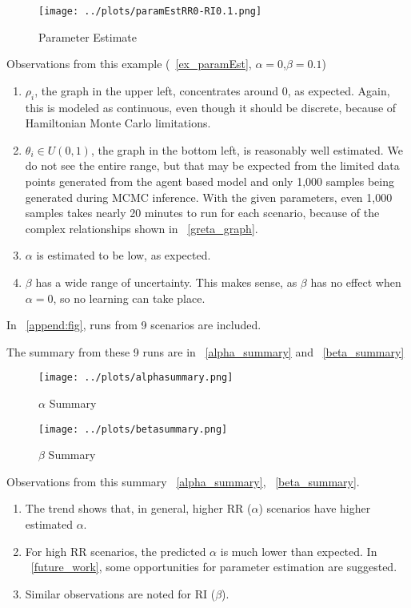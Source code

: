 \documentclass[a4paper, 11pt]{report}
\begin{document}
\begin{figure}[h!]
	\caption{Parameter Estimate}
	\label{ex_paramEst}
	\texttt{[image: ../plots/paramEstRR0-RI0.1.png]}
\end{figure}

\noindent Observations from this example (~\autoref{ex_paramEst}, $\alpha = 0$,$\beta = 0.1$)
\begin{enumerate}
\item $\rho_{i}$, the graph in the upper left, concentrates around 0, as expected. Again, this is modeled as continuous, even though it should be discrete, because of Hamiltonian Monte Carlo limitations.
\item $\theta_{i} \in U(0,1)$, the graph in the bottom left, is reasonably well estimated. We do not see the entire range, but that may be expected from the limited data points generated from the agent based model and only 1,000 samples being generated during MCMC inference. With the given parameters, even 1,000 samples takes nearly 20 minutes to run for each scenario, because of the complex relationships shown in ~\autoref{greta_graph}.
\item $\alpha$ is estimated to be low, as expected.
\item $\beta$ has a wide range of uncertainty. This makes sense, as $\beta$ has no effect when $\alpha = 0$, so no learning can take place.
\end{enumerate}

\noindent In ~\autoref{append:fig}, runs from 9 scenarios are included. 

\noindent The summary from these 9 runs are in ~\autoref{alpha_summary} and ~\autoref{beta_summary}



\begin{figure}[h!] 
	\caption{$\alpha$ Summary}
	\label{alpha_summary}
	 \texttt{[image: ../plots/alphasummary.png]} 
\end{figure}
\begin{figure}[h!] 
	\caption{$\beta$ Summary} 
	\label{beta_summary}
	\texttt{[image: ../plots/betasummary.png]} 
\end{figure}

\noindent Observations from this summary ~\autoref{alpha_summary}, ~\autoref{beta_summary}.
\begin{enumerate}
\item The trend shows that, in general, higher RR ($\alpha$) scenarios have higher estimated $\alpha$.
\item For high RR scenarios, the predicted $\alpha$ is much lower than expected. In ~\autoref{future_work}, some opportunities for parameter estimation are suggested.
\item Similar observations are noted for RI ($\beta$).
\end{enumerate}
\end{document}
